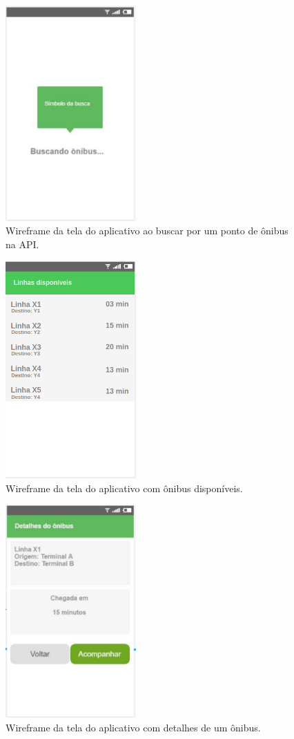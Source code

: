 \documentclass[
	12pt,				%
	oneside,			%
	a4paper,			%
	brazil				%
]{abntex2}
\begin{document}
{\begin{apendicesenv}
\begin{figure}[!h]
\centering
\includegraphics[width=5cm, center]{images/tela-2-buscando-ponto.PNG}
\caption{Wireframe da tela do aplicativo ao buscar por um ponto de ônibus na API.}
\label{Rotulo}
\end{figure}

\begin{figure}[!h]
\centering
\includegraphics[width=5cm, center]{images/tela-3-lista-de-onibus.PNG}
\caption{Wireframe da tela do aplicativo com ônibus disponíveis.}
\label{Rotulo}
\end{figure}

\begin{figure}[!h]
\centering
\includegraphics[width=5cm, center]{images/tela-4-informacoes-do-onibus.PNG}
\caption{Wireframe da tela do aplicativo com detalhes de um ônibus.}
\label{Rotulo}
\end{figure}


\end{apendicesenv}}
\end{document}
